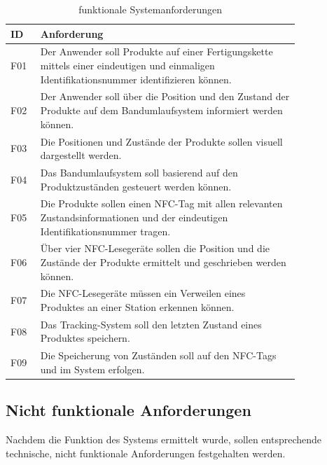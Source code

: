 \begin{table}[H]
	\centering
	\caption{funktionale Systemanforderungen}
	\label{tab:f_anforderungen}
	\begin{tabular}{|p{0.075\linewidth}|p{0.75\linewidth}|}
		\hline
		\textbf{ID} & \textbf{Anforderung} \\ \hline
		
		F01 & Der Anwender soll Produkte auf einer Fertigungskette mittels einer eindeutigen und einmaligen Identifikationsnummer identifizieren können. \\ \hline
		F02 & Der Anwender soll über die Position und den Zustand der Produkte auf dem Bandumlaufsystem informiert werden können. \\ \hline
		F03 & Die Positionen und Zustände der Produkte sollen visuell dargestellt werden. \\ \hline
		F04 & Das Bandumlaufsystem soll basierend auf den Produktzuständen gesteuert werden können. \\ \hline
		F05 & Die Produkte sollen einen NFC-Tag mit allen relevanten Zustandsinformationen und der eindeutigen Identifikationsnummer tragen. \\ \hline
		F06 & Über vier NFC-Lesegeräte sollen die Position und die Zustände der Produkte ermittelt und geschrieben werden können. \\ \hline
		F07 & Die NFC-Lesegeräte müssen ein Verweilen eines Produktes an einer Station erkennen können. \\ \hline
		F08 & Das Tracking-System soll den letzten Zustand eines Produktes speichern. \\ \hline
		F09 & Die Speicherung von Zuständen soll auf den NFC-Tags und im System erfolgen. \\ \hline
	\end{tabular}
\end{table}


\subsection{Nicht funktionale Anforderungen}

Nachdem die Funktion des Systems ermittelt wurde, sollen entsprechende technische, nicht funktionale Anforderungen festgehalten werden. 

